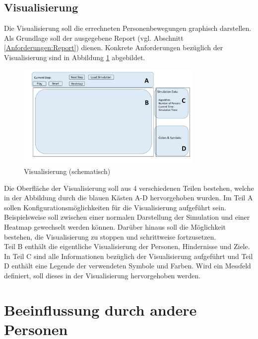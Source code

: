 \subsection{Visualisierung}

Die Visualisierung soll die errechneten Personenbewegungen graphisch darstellen. Als Grundlage soll der ausgegebene Report (vgl. Abschnitt \ref{Anforderungen:Report}) dienen. Konkrete Anforderungen bezüglich der Visualisierung sind in Abbildung \ref{fig:AnforderungenVisualisierung} abgebildet.

\begin{figure}[htpb]
	\centering
	\includegraphics[width=0.8\textwidth]{abbildungen/AnforderungenVisualisierung.pdf}
	\caption{Visualisierung (schematisch)}
	\label{fig:AnforderungenVisualisierung}
\end{figure}

Die Oberfläche der Visualisierung soll aus 4 verschiedenen Teilen bestehen, welche in der Abbildung durch die blauen Kästen A-D hervorgehoben wurden. Im Teil A sollen Konfigurationsmöglichkeiten für die Visualisierung aufgeführt sein. Beispielsweise soll zwischen einer normalen Darstellung der Simulation und einer Heatmap gewechselt werden können. Darüber hinaus soll die Möglichkeit bestehen, die Visualisierung zu stoppen und schrittweise fortzusetzen. \\
Teil B enthält die eigentliche Visualisierung der Personen, Hindernisse und Ziele. In Teil C sind alle Informationen bezüglich der Visualisierung aufgeführt und Teil D enthält eine Legende der verwendeten Symbole und Farben. Wird ein Messfeld definiert, soll dieses in der Visualisierung hervorgehoben werden.

\newpage
\section{Beeinflussung durch andere Personen} 
\label{Personenpotenzial}

